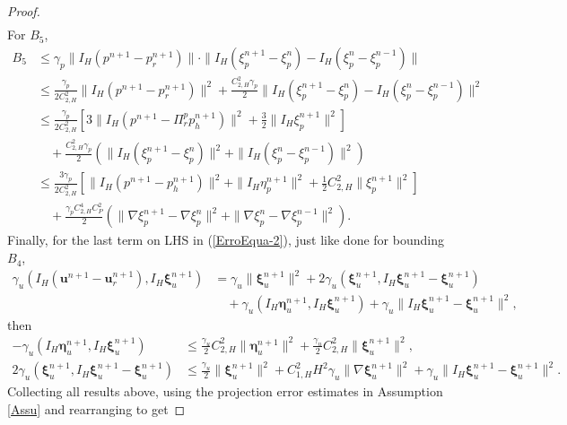 \documentclass[10pt,twoside,openany,UTF8,CJK]{article}
\begin{document}
\begin{proof}
$$\begin{aligned}
    \end{aligned}
    $$
	For $B_5$,
	$$
	\begin{aligned}
		B_5 &\leq \gamma_p\|I_H(p^{n+1} - p^{n+1}_r)\|\cdot\|I_H(\xi^{n+1}_p-\xi^{n}_p) - I_H(\xi^n_p-\xi^{n-1}_p)\| \\
		&\leq \frac{\gamma_p}{2C^2_{2,H}}\|I_H(p^{n+1} - p^{n+1}_r)\|^2 + \frac{C^2_{2,H}\gamma_p}{2}\|I_H(\xi^{n+1}_p-\xi^{n}_p) - I_H(\xi^n_p-\xi^{n-1}_p)\|^2 \\
		&\leq \frac{\gamma_p}{2C^2_{2,H}}\left[3\|I_H(p^{n+1} - \Pi^p_rp^{n+1}_h)\|^2 + \frac32\|I_H\xi^{n+1}_p\|^2\right] \\
		&\quad+ \frac{C^2_{2,H}\gamma_p}{2}\left(\|I_H(\xi^{n+1}_p-\xi^{n}_p)\|^2 + \|I_H(\xi^n_p-\xi^{n-1}_p)\|^2\right)\\
		&\leq \frac{3\gamma_p}{2C^2_{2,H}}\left[\|I_H(p^{n+1} - p^{n+1}_h)\|^2 + \|I_H\eta^{n+1}_p\|^2 + \frac12C^2_{2,H}\|\xi^{n+1}_p\|^2\right] \\
		&\quad+ \frac{\gamma_p C^4_{2,H}C^2_{P}}{2}\left(\|\nabla \xi^{n+1}_p-\nabla \xi^{n}_p\|^2 + \|\nabla \xi^n_p-\nabla \xi^{n-1}_p\|^2\right).
	\end{aligned}
	$$	
	Finally, for the last term on LHS in (\ref{ErroEqua-2}), just like done for bounding $B_4$,
	$$
	\begin{aligned}
		\gamma_u(I_H(\boldsymbol{u}^{n+1} - \boldsymbol{u}^{n+1}_r), I_H\boldsymbol{\xi}^{n+1}_u) &= \gamma_u\|\boldsymbol{\xi}^{n+1}_u\|^2 + 2\gamma_u(\boldsymbol{\xi}^{n+1}_u, I_H\boldsymbol{\xi}^{n+1}_u-\boldsymbol{\xi}^{n+1}_u) \\
		&\quad+ \gamma_u(I_H\boldsymbol{\eta}^{n+1}_u, I_H\boldsymbol{\xi}^{n+1}_u) + \gamma_u\|I_H\boldsymbol{\xi}^{n+1}_u-\boldsymbol{\xi}^{n+1}_u\|^2,
    \end{aligned}
    $$
    then
    $$
    \begin{aligned}
    	- \gamma_u(I_H\boldsymbol{\eta}^{n+1}_u, I_H\boldsymbol{\xi}^{n+1}_u) & \leq \frac{\gamma_u}{2}C^2_{2,H}\|\boldsymbol{\eta}^{n+1}_u\|^2 + \frac{\gamma_u}{2}C^2_{2,H}\|\boldsymbol{\xi}^{n+1}_u\|^2, \\
    	2\gamma_u(\boldsymbol{\xi}^{n+1}_u, I_H\boldsymbol{\xi}^{n+1}_u-\boldsymbol{\xi}^{n+1}_u) &\leq \frac{\gamma_u}{2}\|\boldsymbol{\xi}^{n+1}_u\|^2 + C^2_{1,H}H^2\gamma_u\|\nabla\boldsymbol{\xi}^{n+1}_u\|^2 + \gamma_u\|I_H\boldsymbol{\xi}^{n+1}_u-\boldsymbol{\xi}^{n+1}_u\|^2.
    \end{aligned}
    $$
	Collecting all results above, using the projection error estimates in Assumption \ref{Assu}	and rearranging to get

\end{proof}
\end{document}
